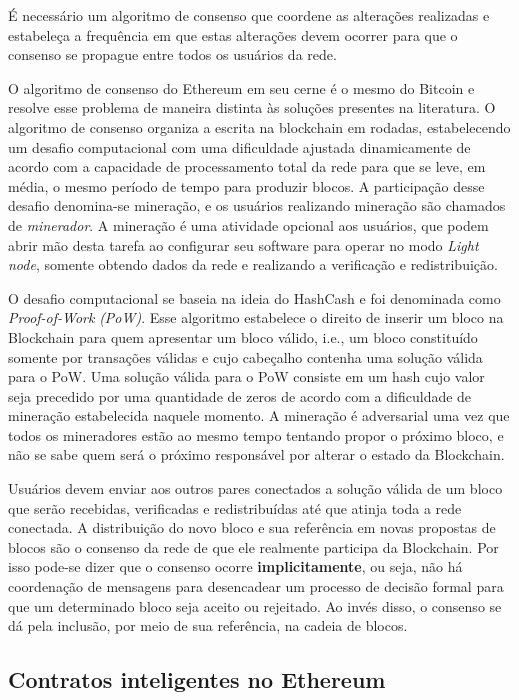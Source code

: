 \documentclass[a4paper,11pt]{article}
\begin{document}
É necessário um algoritmo de consenso que coordene as alterações realizadas e estabeleça a frequência em que estas alterações devem ocorrer para que o consenso se propague entre todos os usuários da rede.

O algoritmo de consenso do Ethereum em seu cerne é o mesmo do Bitcoin e resolve esse problema de maneira distinta às soluções presentes na literatura.
O algoritmo de consenso organiza a escrita na blockchain em rodadas, estabelecendo um desafio computacional com uma dificuldade ajustada dinamicamente de acordo com a capacidade de processamento total da rede para que se leve, em média, o mesmo período de tempo para produzir blocos.
A participação desse desafio denomina-se mineração, e os usuários realizando mineração são chamados de \emph{minerador}.
A mineração é uma atividade opcional aos usuários, que podem abrir mão desta tarefa ao configurar seu software para operar no modo \emph{Light node}, somente obtendo dados da rede e realizando a verificação e redistribuição.

O desafio computacional se baseia na ideia do HashCash \cite{Back2002} e foi denominada como \emph{Proof-of-Work} \emph{(PoW)}.
Esse algoritmo estabelece o direito de inserir um bloco na Blockchain para quem apresentar um bloco válido, i.e., um bloco constituído somente por transações válidas e cujo cabeçalho contenha uma solução válida para o PoW.
Uma solução válida para o PoW consiste em um hash cujo valor seja precedido por uma quantidade de zeros de acordo com a dificuldade de mineração estabelecida naquele momento.
A mineração é adversarial uma vez que todos os mineradores estão ao mesmo tempo tentando propor o próximo bloco, e não se sabe quem será o próximo responsável por alterar o estado da Blockchain.

Usuários devem enviar aos outros pares conectados a solução válida de um bloco que serão recebidas, verificadas e redistribuídas até que atinja toda a rede conectada.
A distribuição do novo bloco e sua referência em novas propostas de blocos são o consenso da rede de que ele realmente participa da Blockchain.
Por isso pode-se dizer que o consenso ocorre \textbf{implicitamente}, ou seja, não há coordenação de mensagens para desencadear um processo de decisão formal para que um determinado bloco seja aceito ou rejeitado.
Ao invés disso, o consenso se dá pela inclusão, por meio de sua referência, na cadeia de blocos.

\subsection{Contratos inteligentes no Ethereum} \label{sec:sub:contratos-ethereum}
\end{document}
